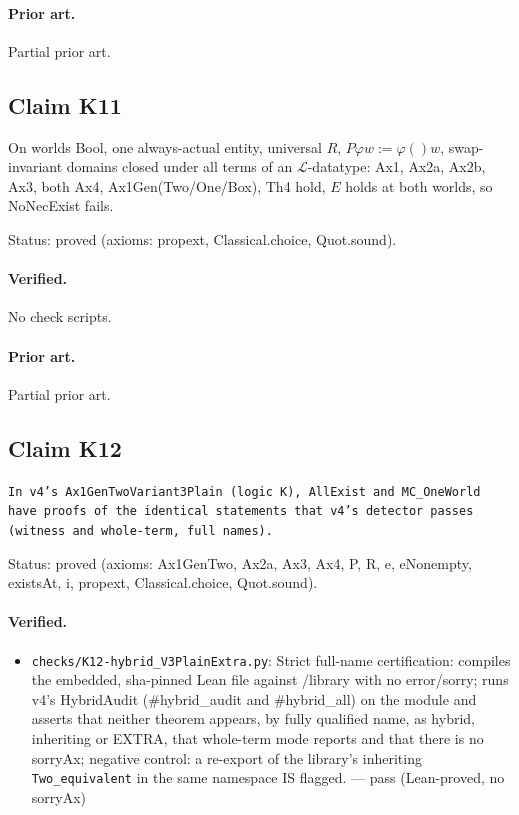 \documentclass{article}
\begin{document}
\paragraph{Prior art.} Partial prior art.

\subsection*{Claim K11}

On worlds Bool, one always-actual entity, universal $R$, $P\varphi w:=\varphi()w$, swap-invariant domains closed under all terms of an $\mathcal L$-datatype: Ax1, Ax2a, Ax2b, Ax3, both Ax4, Ax1Gen(Two/One/Box), Th4 hold, $E$ holds at both worlds, so NoNecExist fails.

Status: proved (axioms: propext, Classical.choice, Quot.sound).

\paragraph{Verified.}
No check scripts.

\paragraph{Prior art.} Partial prior art.

\subsection*{Claim K12}

\texttt{In v4's Ax1GenTwoVariant3Plain (logic K), AllExist and MC\_OneWorld have proofs of the identical statements that v4's detector passes (witness and whole-term, full names).}

Status: proved (axioms: Ax1GenTwo, Ax2a, Ax3, Ax4, P, R, e, eNonempty, existsAt, i, propext, Classical.choice, Quot.sound).

\paragraph{Verified.}
\begin{itemize}
\item \texttt{checks/K12-hybrid\_V3PlainExtra.py}: Strict full-name certification: compiles the embedded, sha-pinned Lean file against /library with no error/sorry; runs v4's HybridAudit (\#hybrid\_audit and \#hybrid\_all) on the module and asserts that neither theorem appears, by fully qualified name, as hybrid, inheriting or EXTRA, that whole-term mode reports and that there is no sorryAx; negative control: a re-export of the library's inheriting \texttt{Two\_equivalent} in the same namespace IS flagged. --- pass (Lean-proved, no sorryAx)
\end{itemize}
\end{document}
